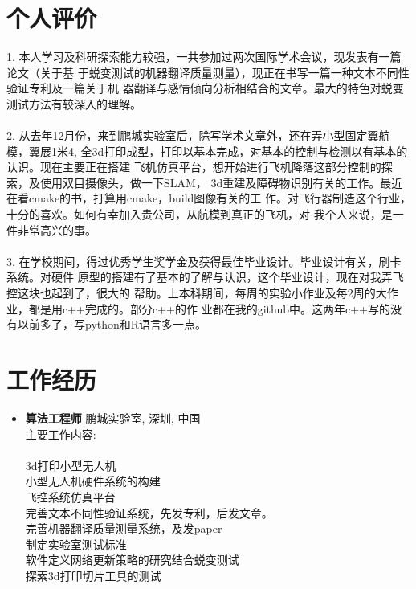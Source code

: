 \documentclass[]{friggeri-cv}
\renewenvironment{entrylist}{%
  \begin{itemize}[leftmargin=1in]%
  }{%
  \end{itemize}
}
\renewcommand{\entry}[4]{%
\item[#1]
  \textbf{#2}%
  \hfill%
  {\footnotesize\addfontfeature{Color=myblue} #3}\\%
  #4\vspace{\parsep}%
}
\begin{document}
\section{个人评价}
1. 本人学习及科研探索能力较强，一共参加过两次国际学术会议，现发表有一篇论文（关于基
于蜕变测试的机器翻译质量测量），现正在书写一篇一种文本不同性验证专利及一篇关于机
器翻译与感情倾向分析相结合的文章。最大的特色对蜕变测试方法有较深入的理解。\\\\
2. 从去年12月份，来到鹏城实验室后，除写学术文章外，还在弄小型固定翼航模，翼展1米4,
全3d打印成型，打印以基本完成，对基本的控制与检测以有基本的认识。现在主要正在搭建
飞机仿真平台，想开始进行飞机降落这部分控制的探索，及使用双目摄像头，做一下SLAM，
3d重建及障碍物识别有关的工作。最近在看cmake的书，打算用cmake，build图像有关的工
作。对飞行器制造这个行业，十分的喜欢。如何有幸加入贵公司，从航模到真正的飞机，对
我个人来说，是一件非常高兴的事。\\\\
3. 在学校期间，得过优秀学生奖学金及获得最佳毕业设计。毕业设计有关，刷卡系统。对硬件
原型的搭建有了基本的了解与认识，这个毕业设计，现在对我弄飞控这块也起到了，很大的
帮助。上本科期间，每周的实验小作业及每2周的大作业，都是用c++完成的。部分c++的作
业都在我的github中。这两年c++写的没有以前多了，写python和R语言多一点。

\section{工作经历}
\begin{entrylist}
  \entry
  {2018.12 至今\\}
  {\large{算法工程师}}
  {鹏城实验室, 深圳, 中国}
  {主要工作内容:\\\\
    3d打印小型无人机\\
    小型无人机硬件系统的构建\\
    飞控系统仿真平台\\
    完善文本不同性验证系统，先发专利，后发文章。\\
    完善机器翻译质量测量系统，及发paper\\
    制定实验室测试标准\\
    软件定义网络更新策略的研究结合蜕变测试\\
    探索3d打印切片工具的测试\\
}
\end{entrylist}
\end{document}
